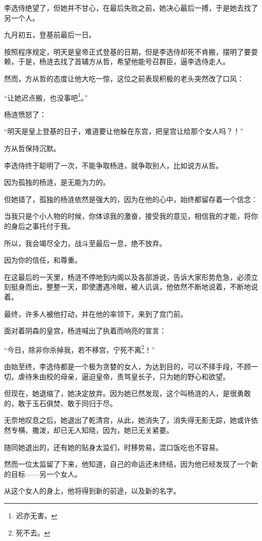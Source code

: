 \begin{multicols}{\theparacolNo}
		李选侍绝望了，但她并不甘心，在最后失败之前，她决心最后一搏，于是她去找了另一个人。

		九月初五，登基前最后一日。

		按照程序规定，明天是皇帝正式登基的日期，但是李选侍却死不肯搬，摆明了要耍赖，于是，杨涟去找了首辅方从哲，希望他能号召群臣，逼李选侍走人。

		然而，方从哲的态度让他大吃一惊，这位之前表现积极的老头突然改了口风：

		“让她迟点搬，也没事吧\footnote{迟亦无害。}。”

		杨涟愤怒了：

		“明天是皇上登基的日子，难道要让他躲在东宫，把皇宫让给那个女人吗？！”

		方从哲保持沉默。

		李选侍终于聪明了一次，不能争取杨涟，就争取别人，比如说方从哲。

		因为孤独的杨涟，是无能为力的。

		但她错了，孤独的杨涟依然是强大的，因为在他的心中，始终都留存着一个信念：

		当我只是个小人物的时候，你体谅我的激奋，接受我的意见，相信我的才能，将你的身后之事托付于我。

		所以，我会竭尽全力，战斗至最后一息，绝不放弃。

		因为你的信任，和尊重。

		在这最后的一天里，杨涟不停地到内阁以及各部游说，告诉大家形势危急，必须立刻挺身而出，整整一天，即使遭遇冷眼，被人讥讽，他依然不断地说着，不断地说着。

		最终，许多人被他打动，并在他的率领下，来到了宫门前。

		面对着阴森的皇宫，杨涟喊出了执着而响亮的宣言：

		“今日，除非你杀掉我，若不移宫，宁死不离\footnote{死不去。}！”

		由始至终，李选侍都是一个极为贪婪的女人，为达到目的，可以不择手段，不顾一切，虐待朱由校的母亲，逼迫皇帝，责骂皇长子，只为她的野心和欲望。

		但现在，她退缩了，她决定放弃。因为她已然发现，这个叫杨涟的人，是很勇敢的，敢于玉石俱焚、敢于同归于尽。

		无奈地叹息之后，她退出了乾清宫，从此，她消失了，消失得无影无踪，她或许依然专横、撒泼，却已无人知晓，因为，她已无关紧要。

		随同她退出的，还有她的贴身太监们，时移势易，混口饭吃也不容易。

		然而一位太监留了下来，他知道，自己的命运还未终结，因为他已经发现了一个新的目标——另一个女人。

		从这个女人的身上，他将得到新的前途，以及新的名字。
		\ifnum{}
	\end{multicols}
\fi
\newpage

